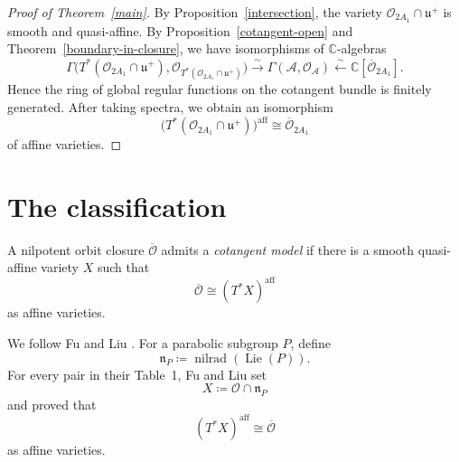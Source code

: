 \documentclass[12pt]{article}
\theoremstyle{definition}
\begin{document}
\begin{proof}[Proof of Theorem~\ref{main}]
By Proposition~\ref{intersection}, the variety
\(\mathcal O_{2A_1}\cap\mathfrak u^+\) is smooth and quasi-affine. By
Proposition~\ref{cotangent-open} and
Theorem~\ref{boundary-in-closure}, we have isomorphisms of
\(\mathbb C\)-algebras
\[
    \Gamma\bigl(T^*(\mathcal O_{2A_1}\cap\mathfrak u^+),
        \mathcal O_{T^*(\mathcal O_{2A_1}\cap\mathfrak u^+)}\bigr)
    \xrightarrow{\sim}
    \Gamma(\mathcal A,\mathcal O_{\mathcal A})
    \xleftarrow{\sim}
    \mathbb C[\overline{\mathcal O}_{2A_1}].
\]
Hence the ring of global regular functions on the cotangent bundle is
finitely generated. After taking spectra, we obtain an isomorphism
\[
    \bigl(T^*(\mathcal O_{2A_1}\cap\mathfrak u^+)\bigr)^{\mathrm{aff}}
    \cong\overline{\mathcal O}_{2A_1}
\]
of affine varieties.
\end{proof}

\section{The classification}

A nilpotent orbit closure \(\overline{\mathcal O}\) admits a \emph{cotangent
model} if there is a smooth quasi-affine variety \(X\) such that
\[
    \overline{\mathcal O}\cong(T^*X)^{\mathrm{aff}}
\]
as affine varieties.

We follow Fu and Liu
\cite[Section~4.2, Table~1, and Theorems~1.4 and~4.2]{FuLiu}. For a
parabolic subgroup \(P\), define
\[
    \mathfrak n_P
    \coloneqq
    \operatorname{nilrad}(\operatorname{Lie}(P)).
\]
For every pair in their Table~1, Fu and Liu set
\[
    X\coloneqq\mathcal O\cap\mathfrak n_P
\]
and proved that
\[
    (T^*X)^{\mathrm{aff}}\cong\overline{\mathcal O}
\]
as affine varieties.
\end{document}
